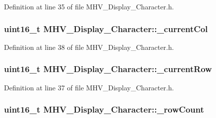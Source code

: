 \-Definition at line 35 of file \-M\-H\-V\-\_\-\-Display\-\_\-\-Character.\-h.

\hypertarget{class_m_h_v___display___character_a476c6bdbc43812bbcc0fdcbf6b9bf1c0}{
\subsubsection[{\-\_\-current\-Col}]{\setlength{\rightskip}{0pt plus 5cm}uint16\-\_\-t {\bf \-M\-H\-V\-\_\-\-Display\-\_\-\-Character\-::\-\_\-current\-Col}}}
\label{class_m_h_v___display___character_a476c6bdbc43812bbcc0fdcbf6b9bf1c0}


\-Definition at line 38 of file \-M\-H\-V\-\_\-\-Display\-\_\-\-Character.\-h.

\hypertarget{class_m_h_v___display___character_a160c646c69a9d1ec89ae7aae96b2d7e1}{
\subsubsection[{\-\_\-current\-Row}]{\setlength{\rightskip}{0pt plus 5cm}uint16\-\_\-t {\bf \-M\-H\-V\-\_\-\-Display\-\_\-\-Character\-::\-\_\-current\-Row}}}
\label{class_m_h_v___display___character_a160c646c69a9d1ec89ae7aae96b2d7e1}


\-Definition at line 37 of file \-M\-H\-V\-\_\-\-Display\-\_\-\-Character.\-h.

\hypertarget{class_m_h_v___display___character_a284180abef731230b71379f2bd394d26}{
\subsubsection[{\-\_\-row\-Count}]{\setlength{\rightskip}{0pt plus 5cm}uint16\-\_\-t {\bf \-M\-H\-V\-\_\-\-Display\-\_\-\-Character\-::\-\_\-row\-Count}}}
\label{class_m_h_v___display___character_a284180abef731230b71379f2bd394d26}


